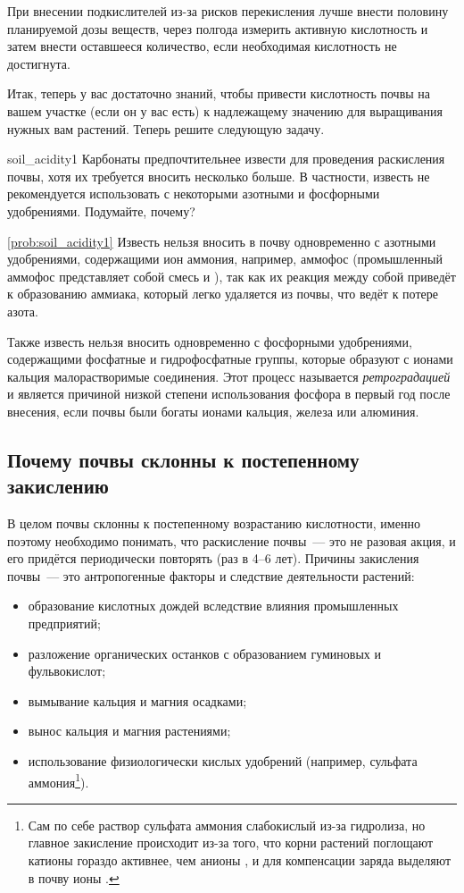 При внесении подкислителей из-за рисков перекисления лучше внести половину планируемой дозы веществ, через полгода измерить активную кислотность и затем внести оставшееся количество, если необходимая кислотность не достигнута.

Итак, теперь у вас достаточно знаний, чтобы привести кислотность почвы на вашем участке (если он у вас есть) к надлежащему значению для выращивания нужных вам растений. Теперь решите следующую задачу.

\begin{problem}{}{soil_acidity1}
    Карбонаты предпочтительнее извести для проведения раскисления почвы, хотя их требуется вносить несколько больше. В частности, известь не рекомендуется использовать с некоторыми азотными и фосфорными удобрениями. Подумайте, почему?
    \begin{sol}{\ref{prob:soil_acidity1}}
        Известь нельзя вносить в почву одновременно с азотными удобрениями, содержащими ион аммония, например, аммофос (промышленный аммофос представляет собой смесь  и ), так как их реакция между собой приведёт к образованию аммиака, который легко удаляется из почвы, что ведёт к потере азота.

        Также известь нельзя вносить одновременно с фосфорными удобрениями, содержащими фосфатные и гидрофосфатные группы, которые образуют с ионами кальция малорастворимые соединения. Этот процесс называется \emph{ретроградацией} и является причиной низкой степени использования фосфора в первый год после внесения, если почвы были богаты ионами кальция, железа или алюминия.
    \end{sol}
\end{problem}

\subsection*{Почему почвы склонны к постепенному закислению}

В целом почвы склонны к постепенному возрастанию кислотности, именно поэтому необходимо понимать, что раскисление почвы~--- это не разовая акция, и его придётся периодически повторять (раз в 4--6 лет). Причины закисления почвы~--- это антропогенные факторы и следствие деятельности растений:

\begin{itemize}
    \item образование кислотных дождей вследствие влияния промышленных предприятий;
    \item разложение органических останков с образованием гуминовых и фульвокислот;
    \item вымывание кальция и магния осадками;
    \item вынос кальция и магния растениями;
    \item использование физиологически кислых удобрений (например, сульфата аммония\footnote{Сам по себе раствор сульфата аммония слабокислый из-за гидролиза, но главное закисление происходит из-за того, что корни растений поглощают катионы  гораздо активнее, чем анионы , и для компенсации заряда выделяют в почву ионы .}).
\end{itemize}

